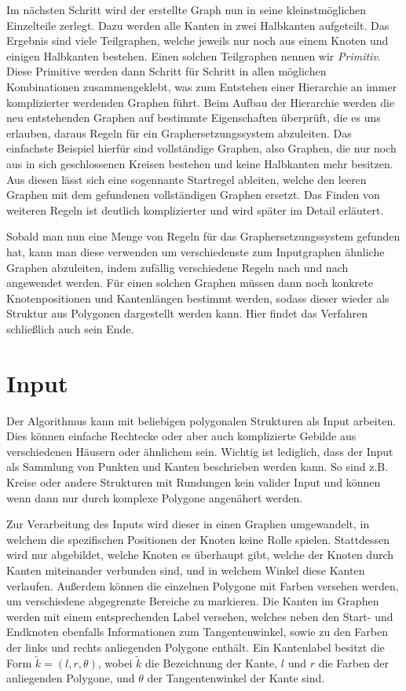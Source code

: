 Im nächsten Schritt wird der erstellte Graph nun in seine kleinstmöglichen Einzelteile zerlegt. Dazu werden alle Kanten in zwei Halbkanten
aufgeteilt. Das Ergebnis sind viele Teilgraphen, welche jeweils nur noch aus einem Knoten und einigen Halbkanten bestehen. Einen solchen Teilgraphen
nennen wir \textit{Primitiv}. Diese Primitive werden dann Schritt für Schritt in allen möglichen Kombinationen zusammengeklebt, was zum Entstehen
einer Hierarchie an immer komplizierter werdenden Graphen führt. Beim Aufbau der Hierarchie werden die neu entstehenden Graphen auf bestimmte
Eigenschaften überprüft, die es uns erlauben, daraus Regeln für ein Graphersetzungssystem abzuleiten. Das einfachste Beispiel hierfür sind
vollständige Graphen, also Graphen, die nur noch aus in sich geschlossenen Kreisen bestehen und keine Halbkanten mehr besitzen. Aus diesen lässt
sich eine sogennante Startregel ableiten, welche den leeren Graphen mit dem gefundenen vollständigen Graphen ersetzt. Das Finden von weiteren
Regeln ist deutlich komplizierter und wird später im Detail erläutert.


Sobald man nun eine Menge von Regeln für das Graphersetzungssystem gefunden hat, kann man diese verwenden um verschiedenste zum Inputgraphen
ähnliche Graphen abzuleiten, indem zufällig verschiedene Regeln nach und nach angewendet werden. Für einen solchen Graphen müssen dann noch
konkrete Knotenpositionen und Kantenlängen bestimmt werden, sodass dieser wieder als Struktur aus Polygonen dargestellt werden kann. Hier
findet das Verfahren schließlich auch sein Ende.

\section{Input}
Der Algorithmus kann mit beliebigen polygonalen Strukturen als Input arbeiten. Dies können einfache Rechtecke oder aber auch komplizierte Gebilde
aus verschiedenen Häusern oder ähnlichem sein. Wichtig ist lediglich, dass der Input als Sammlung von Punkten und Kanten beschrieben werden kann.
So sind z.B. Kreise oder andere Strukturen mit Rundungen kein valider Input und können wenn dann nur durch komplexe Polygone angenähert werden.

Zur Verarbeitung des Inputs wird dieser in einen Graphen umgewandelt, in welchem die spezifischen Positionen der Knoten keine Rolle spielen.
Stattdessen wird nur abgebildet, welche Knoten es überhaupt gibt, welche der Knoten durch Kanten miteinander verbunden sind, und in welchem Winkel
diese Kanten verlaufen. Außerdem können die einzelnen Polygone mit Farben versehen werden, um verschiedene abgegrenzte Bereiche zu markieren.
Die Kanten im Graphen werden mit einem entsprechenden Label versehen, welches neben den Start- und Endknoten ebenfalls Informationen zum
Tangentenwinkel, sowie zu den Farben der links und rechts anliegenden Polygone enthält. Ein Kantenlabel besitzt die Form
\(\tilde{k} = (l,r,\theta)\), wobei \(\tilde{k}\) die Bezeichnung der Kante, \(l\) und \(r\) die Farben der anliegenden Polygone, und
\(\theta\) der Tangentenwinkel der Kante sind.

